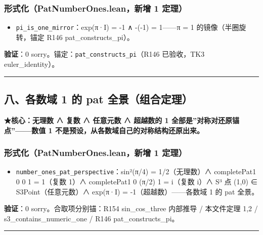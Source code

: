 \documentclass[
]{article}
\providecommand{\tightlist}{%
  \setlength{\itemsep}{0pt}\setlength{\parskip}{0pt}}
\begin{document}
\subsubsection{形式化（PatNumberOnes.lean，新增 1
定理）}\label{ux5f62ux5f0fux5316patnumberones.leanux65b0ux589e-1-ux5b9aux7406}

\begin{itemize}
\tightlist
\item
  \texttt{pi\_is\_one\_mirror}：exp(π·I) = -1 ∧ -(-1) = 1------π = 1
  的镜像（半圈旋转，锚定 R146 pat\_constructs\_pi）。
\end{itemize}

\textbf{验证}：0 sorry。锚定：\texttt{pat\_constructs\_pi}（R146
已验收，TK3 euler\_identity）。

\begin{center}\rule{0.5\linewidth}{0.5pt}\end{center}

\subsection{八、各数域 1 的 pat
全景（组合定理）}\label{ux516bux5404ux6570ux57df-1-ux7684-pat-ux5168ux666fux7ec4ux5408ux5b9aux7406}

\textbf{★核心：无理数 ∧ 复数 ∧ 任意元数 ∧ 超越数的 1
全部是''对称对还原锚点''------数值 1
不是预设，从各数域自己的对称结构还原出来。}

\subsubsection{形式化（PatNumberOnes.lean，新增 1
定理）}\label{ux5f62ux5f0fux5316patnumberones.leanux65b0ux589e-1-ux5b9aux7406-1}

\begin{itemize}
\tightlist
\item
  \texttt{number\_ones\_pat\_perspective}：sin²(π/4) = 1/2（无理数）∧
  completePat1 0 0 1 = 1（复数 1）∧ completePat1 0 (π/2) 1 = i（复数
  i）∧ S³ 点 (1,0) ∈ S3Point（任意元数）∧ exp(π·I) =
  -1（超越数）------各数域 1 的 pat 全景。
\end{itemize}

\textbf{验证}：0 sorry。合取项分别锚：R154 sin\_cos\_three 内部推导 /
本文件定理 1,2 / s3\_contains\_numeric\_one / R146 pat\_constructs\_pi。

\begin{center}\rule{0.5\linewidth}{0.5pt}\end{center}
\end{document}
